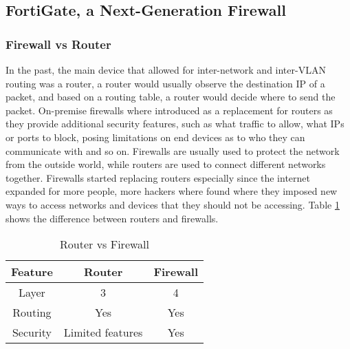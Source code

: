\documentclass[12pt]{report}
\begin{document}
\subsection{FortiGate, a Next-Generation Firewall}
\subsubsection{Firewall vs Router}
In the past, the main device that allowed for inter-network and inter-VLAN routing was a router, a router would usually observe the destination IP of a packet, and based on a routing table, a router would decide where to send the packet. On-premise firewalls where introduced as a replacement for routers as they provide additional security features, such as what traffic to allow, what IPs or ports to block, posing limitations on end devices as to who they can communicate with and so on. Firewalls are usually used to protect the network from the outside world, while routers are used to connect different networks together. Firewalls started replacing routers especially since the internet expanded for more people, more hackers where found where they imposed new ways to access networks and devices that they should not be accessing. Table \ref{tab:router vs firewall} shows the difference between routers and firewalls. \cite{FWvsRout}

\begin{table}[h]
    \centering
    \begin{tabular}{|c|c|c|}
    \hline
    \textbf{Feature} & \textbf{Router} & \textbf{Firewall} \\ \hline
    Layer & 3 & 4 \\ \hline
    Routing & Yes & Yes \\ \hline
    Security & Limited features & Yes \\ \hline
    \end{tabular}
    \caption{Router vs Firewall}
    \label{tab:router vs firewall}
\end{table}
\end{document}

